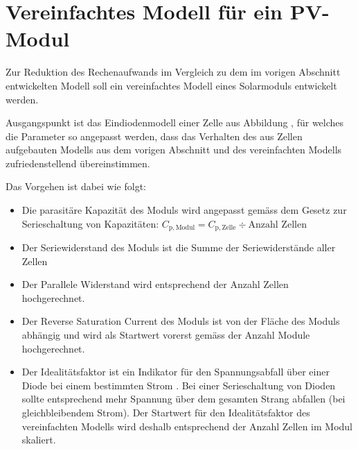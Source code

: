 \clearpage
\section{Vereinfachtes Modell f\"ur ein PV-Modul}
\label{app:models:develop:module:simple}

Zur  Reduktion des  Rechenaufwands im  Vergleich zu  dem im  vorigen Abschnitt
entwickelten Modell soll ein vereinfachtes Modell eines Solarmoduls entwickelt
werden.

Ausgangspunkt   ist   das   Eindiodenmodell    einer   Zelle   aus   Abbildung
, f\"ur  welches die Parameter  so angepasst werden,  dass das
Verhalten des aus Zellen aufgebauten Modells aus dem vorigen Abschnitt und des
vereinfachten Modells zufriedenstellend \"ubereinstimmen.

Das Vorgehen ist dabei wie folgt: 

\begin{itemize}
    \item
        Die parasit\"are  Kapazit\"at des  Moduls wird angepasst  gem\"ass dem
        Gesetz zur Serieschaltung von Kapazit\"aten:
        $C_{\mathrm{p, Modul}} = C_{\mathrm{p, Zelle}} \div \text{Anzahl Zellen}$
    \item
        Der Seriewiderstand des Moduls ist die Summe der Seriewiderst\"ande aller
        Zellen
    \item
        Der  Parallele   Widerstand  wird   entsprechend  der   Anzahl  Zellen
        hochgerechnet.
    \item
        Der Reverse  Saturation Current  des Moduls ist  von der  Fl\"ache des
        Moduls abh\"angig und  wird als Startwert vorerst  gem\"ass der Anzahl
        Module hochgerechnet.
    \item
        Der  Idealit\"atsfaktor ist  ein Indikator  f\"ur den  Spannungsabfall
        \"uber   einer   Diode   bei   einem   bestimmten   Strom   . Bei  einer Serieschaltung  von Dioden  sollte entsprechend
        mehr   Spannung    \"uber   dem   gesamten   Strang    abfallen   (bei
        gleichbleibendem  Strom). Der Startwert  f\"ur den  Idealit\"atsfaktor
        des vereinfachten Modells wird  deshalb entsprechend der Anzahl Zellen
        im Modul skaliert.
\end{itemize}

